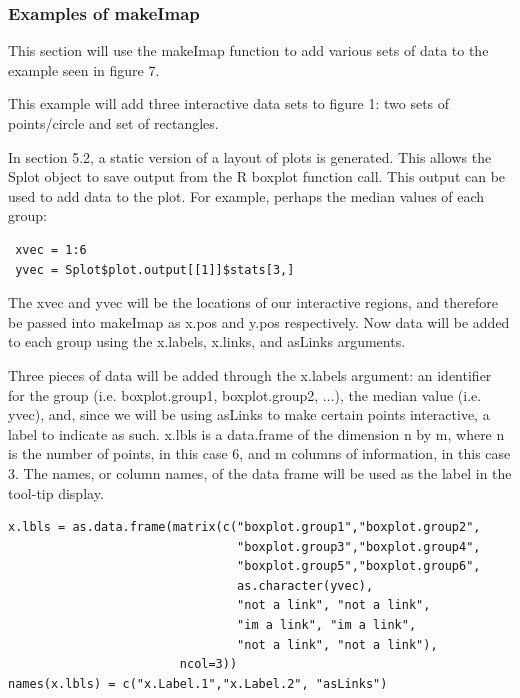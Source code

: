 \documentclass[]{article}
\begin{document}
\subsubsection{Examples of makeImap}

This section will use the makeImap function to add various sets of data to the example seen in figure 7. 
\vspace{5mm}



\vspace{5mm}

\normalsize

This example will add three interactive data sets to figure 1: two sets of points/circle and set of rectangles. 

In section 5.2, a static version of a layout of plots is generated. This allows the Splot object to save output from the R boxplot function call. This output can be used to add data to the plot. For example, perhaps the median values of each group: 


\begin{verbatim}
 xvec = 1:6
 yvec = Splot$plot.output[[1]]$stats[3,]
\end{verbatim}

The xvec and yvec will be the locations of our interactive regions, and therefore be passed into makeImap as x.pos and y.pos respectively. Now data will be added to each group using the x.labels, x.links, and asLinks arguments. 

Three pieces of data will be added through the x.labels argument: an identifier for the group (i.e. boxplot.group1, boxplot.group2, ...), the median value (i.e. yvec), and, since we will be using asLinks to make certain points interactive, a label to indicate as such. x.lbls is a data.frame of the dimension n by m, where n is the number of points, in this case 6, and m columns of information, in this case 3. The names, or column names, of the data frame will be used as the label in the tool-tip display.   


\begin{verbatim}
x.lbls = as.data.frame(matrix(c("boxplot.group1","boxplot.group2",
                                "boxplot.group3","boxplot.group4",
                                "boxplot.group5","boxplot.group6", 
                                as.character(yvec),
                                "not a link", "not a link", 
                                "im a link", "im a link",
                                "not a link", "not a link"),
                        ncol=3))
names(x.lbls) = c("x.Label.1","x.Label.2", "asLinks")  
\end{verbatim}
\end{document}
